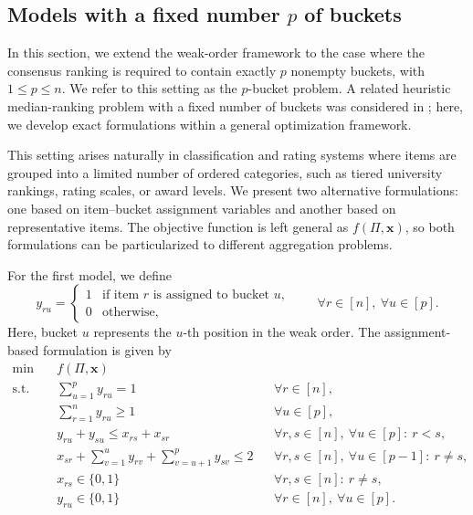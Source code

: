 \documentclass[pdflatex,basic,Numbered]{jnl}%
\theoremstyle{plain}
\theoremstyle{remark}
\theoremstyle{thmstyleone}%
\theoremstyle{thmstylethree}%
\begin{document}
\subsection{Models with a fixed number \texorpdfstring{$p$}{p} of buckets}
\label{sec:numero_fijo}

In this section, we extend the weak-order framework to the case where the consensus ranking is required to contain exactly \(p\) nonempty buckets, with \(1\le p\le n\). We refer to this setting as the \(p\)-bucket problem. A related heuristic median-ranking problem with a fixed number of buckets was considered in \cite{d2019median}; here, we develop exact formulations within a general optimization framework.

This setting arises naturally in classification and rating systems where items are grouped into a limited number of ordered categories, such as tiered university rankings, rating scales, or award levels. We present two alternative formulations: one based on item--bucket assignment variables and another based on representative items. The objective function is left general as \(f(\Pi,\bm{x})\), so both formulations can be particularized to different aggregation problems.

For the first model, we define
\[
y_{ru}=
\begin{cases}
1 & \text{if item } r \text{ is assigned to bucket } u,\\
0 & \text{otherwise},
\end{cases}
\qquad
\forall r\in[n],\ \forall u\in[p].
\]
Here, bucket \(u\) represents the \(u\)-th position in the weak order. The assignment-based formulation is given by
\begin{subequations} \label{mod:p-bucket_1}
    \begin{align} 
    \min\quad & f(\Pi,\bm{x}) \\
    \text{s.t.}\quad 
        & \sum_{u=1}^p y_{ru}=1
        && \forall r\in[n], \label{eq:elemento_en_bucket_3} \\
        & \sum_{r=1}^n y_{ru}\ge 1
        && \forall u\in[p], \label{eq:buckets_no_vacios_3} \\
        & y_{ru}+y_{su}\le x_{rs}+x_{sr}
        && \forall r,s\in[n],\ \forall u\in[p]:\ r<s, \label{eq:empates_bucket_3} \\
        & x_{sr}+\sum_{v=1}^{u}y_{rv}
        +\sum_{v=u+1}^{p}y_{sv}\le 2
        && \forall r,s\in[n],\ \forall u\in[p-1]:\ r\neq s, \label{eq:buckets_ordenados_3} \\
        & x_{rs}\in\{0,1\}
        && \forall r,s\in[n]:\ r\neq s, \label{eq:naturaleza_x_3} \\
        & y_{ru}\in\{0,1\}
        && \forall r\in[n],\ \forall u\in[p]. \label{eq:naturaleza_y_3}
    \end{align}
\end{subequations}
\end{document}

